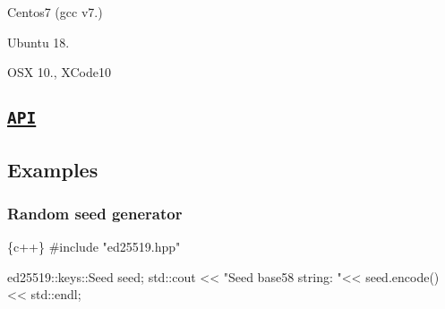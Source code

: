 \begin{DoxyEnumerate}
\item Centos7 (gcc v7.)
\end{DoxyEnumerate}
\begin{DoxyEnumerate}
\item Ubuntu 18.
\end{DoxyEnumerate}
\begin{DoxyEnumerate}
\item O\+SX 10., X\+Code10
\end{DoxyEnumerate}

\subsection*{\href{https://htmlpreview.github.io/?https://github.com/dnevera/ed25519cpp/blob/master/docs/html/namespaces.html}{\tt A\+PI}}

\subsection*{Examples}

\subsubsection*{Random seed generator}


\begin{DoxyCode}
\{c++\}
#include "ed25519.hpp"


ed25519::keys::Seed seed;
std::cout << "Seed base58 string: "<< seed.encode() << std::endl;
\end{DoxyCode}
 
